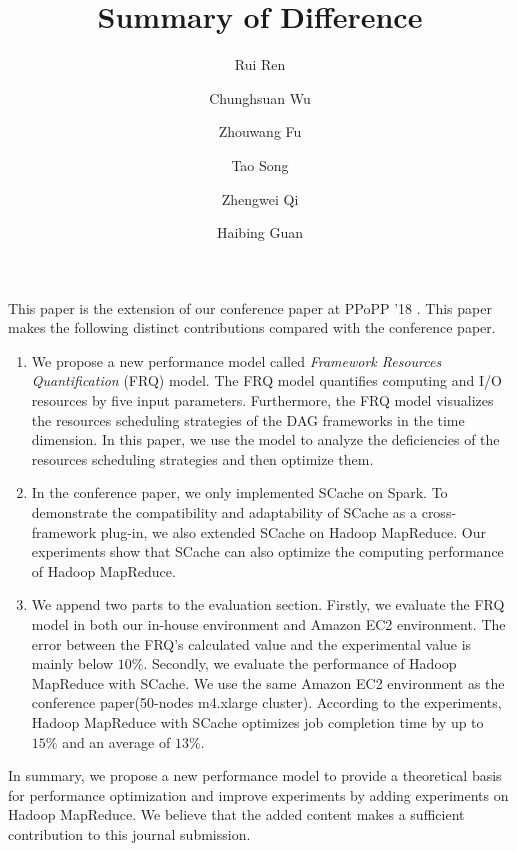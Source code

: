 \documentclass[12pt,reqno]{amsart}
\title{Summary of Difference}
\author{Rui Ren}
\author{Chunghsuan Wu}
\author{Zhouwang Fu}
\author{Tao Song}
\author{Zhengwei Qi}
\author{Haibing Guan}
\theoremstyle{plain}
\numberwithin{equation}{section}
\theoremstyle{plain}
\numberwithin{equation}{section}
\begin{document}
\maketitle



This paper is the extension of our conference paper at PPoPP '18 \cite{fu2018efficient}. 
This paper makes the following distinct contributions compared with the conference paper.

\begin{enumerate}
\item 
We propose a new performance model called \textit{Framework Resources Quantification} (FRQ) model.
The FRQ model quantifies computing and I/O resources by five input parameters. 
Furthermore, the FRQ model visualizes the resources scheduling strategies of the DAG frameworks in the time dimension. 
In this paper, we use the model to analyze the deficiencies of the resources scheduling strategies and then optimize them.

\item 
In the conference paper, we only implemented SCache on Spark. 
To demonstrate the compatibility and adaptability of SCache as a cross-framework plug-in, we also extended SCache on Hadoop MapReduce. 
Our experiments show that SCache can also optimize the computing performance of Hadoop MapReduce.
\item
We append two parts to the evaluation section. 
Firstly, we evaluate the FRQ model in both our in-house environment and Amazon EC2 environment. The error between the FRQ’s calculated value and the experimental value is mainly below $10\%$. 
Secondly, we evaluate the performance of Hadoop MapReduce with SCache. We use the same Amazon EC2 environment as the conference paper(50-nodes m4.xlarge cluster).
According to the experiments, Hadoop MapReduce with SCache optimizes job completion time by up to $15\%$ and an average of $13\%$.
\end{enumerate}

In summary, we propose a new performance model to provide a theoretical basis for performance optimization and improve experiments by adding experiments on Hadoop MapReduce. 
We believe that the added content makes a sufficient contribution to this journal submission.



\end{document}
